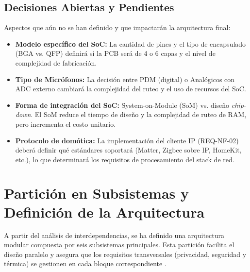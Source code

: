 \documentclass[%
	paper=a4,
	twoside=false,
	parskip=half,
	chapterprefix=false,
	10pt,
	headings=normal,
	bibliography=totoc,
	listof=totoc,
	titlepage=on,
	captions=tableabove,
	draft=false,
]{scrbook}%
\begin{document}
\section{Decisiones Abiertas y Pendientes}

Aspectos que aún no se han definido y que impactarán la arquitectura final:

\begin{itemize}
    \item \textbf{Modelo específico del SoC:} La cantidad de pines y el tipo de encapsulado (BGA vs. QFP) definirá si la PCB será de 4 o 6 capas y el nivel de complejidad de fabricación.
    \item \textbf{Tipo de Micrófonos:} La decisión entre PDM (digital) o Analógicos con ADC externo cambiará la complejidad del ruteo y el uso de recursos del SoC.
    \item \textbf{Forma de integración del SoC:} System-on-Module (SoM) vs. diseño \textit{chip-down}. El SoM reduce el tiempo de diseño y la complejidad de ruteo de RAM, pero incrementa el costo unitario.
    \item \textbf{Protocolo de domótica:} La implementación del cliente IP (REQ-NF-02) deberá definir qué estándares soportará (Matter, Zigbee sobre IP, HomeKit, etc.), lo que determinará los requisitos de procesamiento del stack de red.
\end{itemize}

\chapter{Partición en Subsistemas y Definición de la Arquitectura}
\label{chap:subsistemas}

A partir del análisis de interdependencias, se ha definido una arquitectura modular compuesta por seis subsistemas principales. Esta partición facilita el diseño paralelo y asegura que los requisitos transversales (privacidad, seguridad y térmica) se gestionen en cada bloque correspondiente \cite{guia_entregable2}.
\end{document}

